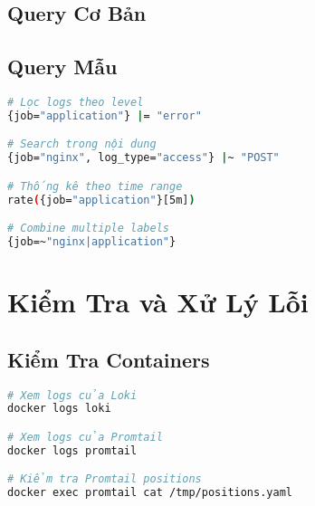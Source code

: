 \documentclass[a4paper,12pt]{article}
\begin{document}
\subsection{Query Cơ Bản}


\subsection{Query Mẫu}

\begin{lstlisting}[language=bash]
# Lọc logs theo level
{job="application"} |= "error"

# Search trong nội dung
{job="nginx", log_type="access"} |~ "POST"

# Thống kê theo time range
rate({job="application"}[5m])

# Combine multiple labels
{job=~"nginx|application"}
\end{lstlisting}

\section{Kiểm Tra và Xử Lý Lỗi}

\subsection{Kiểm Tra Containers}

\begin{lstlisting}[language=bash]
# Xem logs của Loki
docker logs loki

# Xem logs của Promtail
docker logs promtail

# Kiểm tra Promtail positions
docker exec promtail cat /tmp/positions.yaml
\end{lstlisting}
\end{document}
